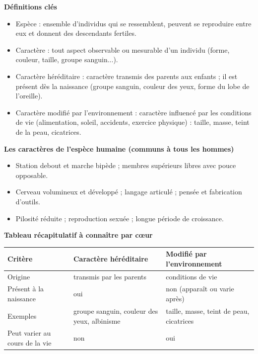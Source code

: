 \documentclass[11pt]{article}
\newcommand{\cle}[1]{{\popxbold\color{popdark}#1}}
\newcounter{popsec}
\newcounter{popsub}
\newcommand{\courssub}[1]{%
  \stepcounter{popsub}%
  \par\vspace{9pt}\noindent{\popxbold\fontsize{11.5}{13}\selectfont\color{popink}{\color{poporange}\thepopsec.\thepopsub}\hspace{6pt}#1}\par\nopagebreak\vspace{4pt}
}
\begin{document}
\courssub{L'essentiel à retenir}

\begin{bilan}
\textbf{Définitions clés}
\begin{itemize}
  \item \cle{Espèce} : ensemble d'individus qui se ressemblent, peuvent se reproduire entre eux et donnent des descendants fertiles.
  \item \cle{Caractère} : tout aspect observable ou mesurable d'un individu (forme, couleur, taille, groupe sanguin...).
  \item \cle{Caractère héréditaire} : caractère transmis des parents aux enfants ; il est présent dès la naissance (groupe sanguin, couleur des yeux, forme du lobe de l'oreille).
  \item \cle{Caractère modifié par l'environnement} : caractère influencé par les conditions de vie (alimentation, soleil, accidents, exercice physique) : taille, masse, teint de la peau, cicatrices.
\end{itemize}

\textbf{Les caractères de l'espèce humaine (communs à tous les hommes)}
\begin{itemize}
  \item Station debout et marche bipède ; membres supérieurs libres avec pouce opposable.
  \item Cerveau volumineux et développé ; langage articulé ; pensée et fabrication d'outils.
  \item Pilosité réduite ; reproduction sexuée ; longue période de croissance.
\end{itemize}

\textbf{Tableau récapitulatif à connaître par c\oe ur}
\begin{center}
\begin{tabularx}{\linewidth}{|l|X|X|}
\hline
\rowcolor{popblueL} \textbf{Critère} & \textbf{Caractère héréditaire} & \textbf{Modifié par l'environnement} \\
\hline
Origine & transmis par les parents & conditions de vie \\
\hline
Présent à la naissance & oui & non (apparaît ou varie après) \\
\hline
Exemples & groupe sanguin, couleur des yeux, albinisme & taille, masse, teint de peau, cicatrices \\
\hline
Peut varier au cours de la vie & non & oui \\
\hline
\end{tabularx}
\end{center}


\end{bilan}
\end{document}
